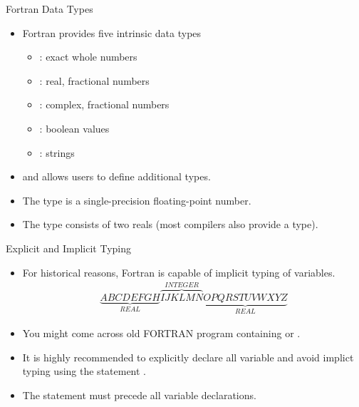 \documentclass[10pt,t]{beamer}
\begin{document}
\begin{frame}[fragile]{Fortran Data Types}
  \begin{itemize}
  \item Fortran provides five intrinsic data types
    \begin{itemize}
    \item[] : exact whole numbers
    \item[] : real, fractional numbers
    \item[] : complex, fractional numbers
    \item[] : boolean values
    \item[] : strings
    \end{itemize}
  \item and allows users to define additional types.
  \item The  type is a single-precision floating-point number.
  \item The  type consists of two reals (most compilers also provide a  type).
  \end{itemize}
\end{frame}

\begin{frame}{Explicit and Implicit Typing}
  \begin{itemize}
  \item For historical reasons, Fortran is capable of implicit typing of variables.
    \begin{gather*}
      \underbrace{ABCDEFGH}_{REAL}\overbrace{IJKLMN}^{INTEGER}\underbrace{OPQRSTUVWXYZ}_{REAL}
    \end{gather*}
  \item You might come across old FORTRAN program containing  or .
  \item It is highly recommended to explicitly declare all variable and avoid implict typing using the statement .
  \item The  statement must precede all variable declarations.
  \end{itemize}
\end{frame}
\end{document}
